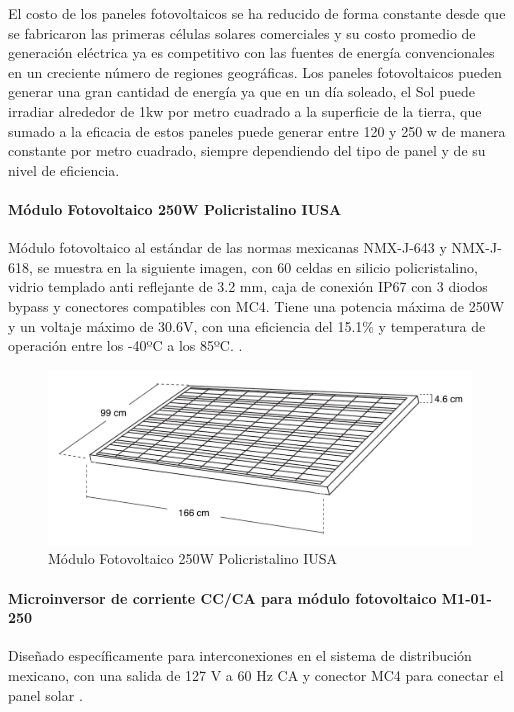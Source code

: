 El costo de los paneles fotovoltaicos se ha reducido de forma constante desde que se fabricaron las primeras células solares comerciales y su costo promedio de generación eléctrica ya es competitivo con las fuentes de energía convencionales en un creciente número de regiones geográficas.
Los paneles fotovoltaicos pueden generar una gran cantidad de energía ya que en un día soleado, el Sol puede irradiar alrededor de 1kw por metro cuadrado a la superficie de la tierra, que sumado a la eficacia de estos paneles puede generar entre 120 y 250 w de manera constante por metro cuadrado, siempre dependiendo del tipo de panel y de su nivel de eficiencia.

\paragraph{Módulo Fotovoltaico 250W Policristalino IUSA}
Módulo fotovoltaico al estándar de las normas mexicanas NMX-J-643 y NMX-J-618, se muestra en la siguiente imagen, con 60 celdas en silicio policristalino, vidrio templado anti reflejante de 3.2 mm, caja de conexión IP67 con 3 diodos bypass y conectores compatibles con MC4.
Tiene una potencia máxima de 250W y un voltaje máximo de 30.6V, con una eficiencia del 15.1\% y temperatura de operación entre los -40ºC a los 85ºC. \citep{MarcoTeorico3}.

\begin{figure}[H]
	\centering
	\includegraphics[scale=.25]{Capitulo2/images/panel.png}
	\caption{Módulo Fotovoltaico 250W Policristalino IUSA}
	\label{fig:diagrama_dispensador}
\end{figure}

\paragraph{Microinversor de corriente CC/CA para módulo fotovoltaico M1-01-250}
Diseñado específicamente para interconexiones en el sistema de distribución mexicano, con una salida de 127 V a 60 Hz CA y conector MC4 para conectar el panel solar \citep{MarcoTeorico3}.

